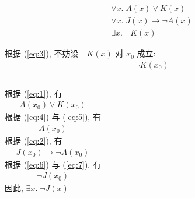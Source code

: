 \begin{frame}{}
  \setcounter{equation}{0}
  \begin{align}
    \forall x.\; A(x) \lor K(x) \label{eq:1} \\[3pt]
    \forall x.\; J(x) \to \lnot A(x) \label{eq:2} \\[3pt]
    \exists x.\; \lnot K(x) \label{eq:3}
  \end{align}

  \pause
  \begin{center}
    根据 (\ref{eq:3}), 不妨设 $\lnot K(x)$ 对 $x_{0}$ 成立:
    \begin{align}
      \lnot K(x_{0}) \label{eq:4}
    \end{align}
    \begin{columns}
        \pause
        根据 (\ref{eq:1}), 有
        \begin{align}
          A(x_{0}) \lor K(x_{0}) \label{eq:5}
        \end{align}
        \pause
        根据 (\ref{eq:4}) 与 (\ref{eq:5}), 有
        \begin{align}
          A(x_{0}) \label{eq:6}
        \end{align}
        \pause
        根据 (\ref{eq:2}), 有
        \begin{align}
          J(x_{0}) \to \lnot A(x_{0}) \label{eq:7}
        \end{align}
        \pause
        根据 (\ref{eq:6}) 与 (\ref{eq:7}), 有
        \begin{align}
          \lnot J(x_{0}) \label{eq:8}
        \end{align}
        \pause
        因此, $\exists x.\; \lnot J(x)$
    \end{columns}
  \end{center}
\end{frame}
